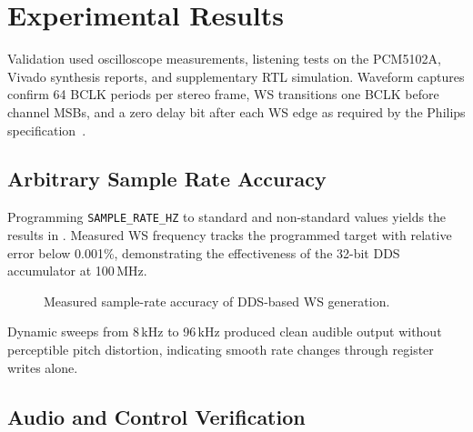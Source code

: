 \section{Experimental Results}
\label{sec:results}

Validation used oscilloscope measurements, listening tests on the PCM5102A, Vivado synthesis reports, and supplementary RTL simulation.
Waveform captures confirm 64 BCLK periods per stereo frame, WS transitions one BCLK before channel MSBs, and a zero delay bit after each WS edge as required by the Philips specification~\cite{philips_i2s_1986}.

\subsection{Arbitrary Sample Rate Accuracy}

Programming \texttt{SAMPLE\_RATE\_HZ} to standard and non-standard values yields the results in .
Measured WS frequency tracks the programmed target with relative error below 0.001\%, demonstrating the effectiveness of the 32-bit DDS accumulator at 100\,MHz.

\begin{figure}[!t]
  \caption{Measured sample-rate accuracy of DDS-based WS generation.}
  \label{tab:fs-accuracy}
  \centering
\end{figure}

Dynamic sweeps from 8\,kHz to 96\,kHz produced clean audible output without perceptible pitch distortion, indicating smooth rate changes through register writes alone.

\subsection{Audio and Control Verification}

